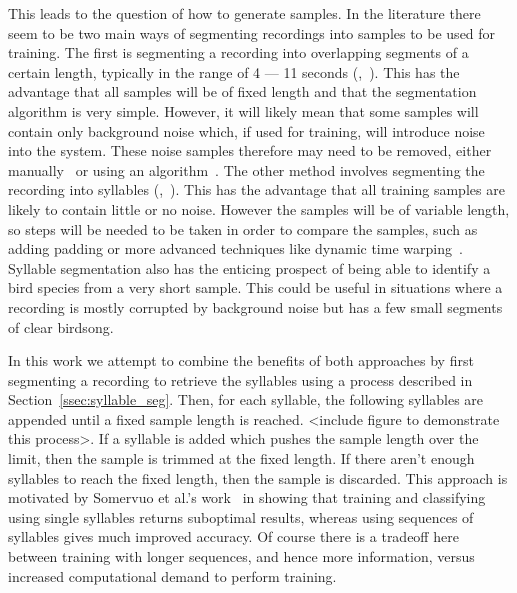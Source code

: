 This leads to the question of how to generate samples. In the literature there
seem to be two main ways of segmenting recordings into samples to be used for
training. The first is segmenting a recording into overlapping segments of a
certain length, typically in the range of 4 --- 11 seconds
(\cite{yan2021birdsong},~\cite{crous2019polyphonic}). This has the advantage
that all samples will be of fixed length and that the segmentation algorithm is
very simple. However, it will likely mean that some samples will contain only
background noise which, if used for training, will introduce noise into the
system. These noise samples therefore may need to be removed, either
manually~\cite{yan2021birdsong} or using an
algorithm~\cite{narasimhan2017simultaneous}. The other method involves
segmenting the recording into syllables
(\cite{fagerlund2007bird},~\cite{ramashini2022robust}). This has the advantage
that all training samples are likely to contain little or no noise. However the
samples will be of variable length, so steps will be needed to be taken in order
to compare the samples, such as adding padding or more advanced techniques like
dynamic time warping~\cite{somervuo2006parametric}. Syllable segmentation also
has the enticing prospect of being able to identify a bird species from a very
short sample. This could be useful in situations where a recording is mostly
corrupted by background noise but has a few small segments of clear birdsong.

In this work we attempt to combine the benefits of both approaches by first
segmenting a recording to retrieve the syllables using a process described in
Section~\ref{ssec:syllable_seg}. Then, for each syllable, the following
syllables are appended until a fixed sample length is reached. <include figure
to demonstrate this process>. If a syllable is
added which pushes the sample length over the limit, then the sample is trimmed
at the fixed length. If there aren't enough syllables to reach the fixed length,
then the sample is discarded. This approach is motivated by Somervuo et al.'s
work~\cite{somervuo2006parametric} in showing that training and classifying
using single syllables returns suboptimal results, whereas using sequences of
syllables gives much improved accuracy. Of course there is a tradeoff here
between training with longer sequences, and hence more information, versus
increased computational demand to perform training.

